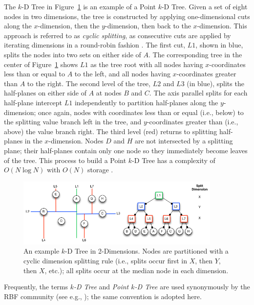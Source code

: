 \documentclass{report}
\begin{document}
The $k$-D Tree in Figure~\ref{fig:kdtree_example} is an example of a Point $k$-D Tree. Given a set of eight nodes in two dimensions, the tree is constructed by applying one-dimensional cuts along the $x$-dimension, then the $y$-dimension, then back to the $x$-dimension. This approach is referred to as \emph{cyclic splitting}, as consecutive cuts are applied by iterating dimensions in a round-robin fashion \cite{Samet2005}. The first cut, $L1$, shown in blue, splits the nodes into two sets on either side of $A$. The corresponding tree in the center of Figure~\ref{fig:kdtree_example} shows $L1$ as the tree root with all nodes having $x$-coordinates less than or equal to $A$ to the left, and all nodes having $x$-coordinates greater than $A$ to the right. The second level of the tree, $L2$ and $L3$ (in blue), splits the half-planes on either side of $A$ at nodes $B$ and $C$. The axis parallel splits for each half-plane intercept $L1$ independently to partition half-planes along the $y$-dimension; once again, nodes with coordinates less than or equal (i.e., below) to the splitting value branch left in the tree, and $y$-coordinates greater than  (i.e., above) the value branch right. The third level (red) returns to splitting half-planes in the $x$-dimension. Nodes $D$ and $H$ are not intersected by a splitting plane; their half-planes contain only one node so they immediately become leaves of the tree. This process to build a Point $k$-D Tree has a complexity of $O(N \log N)$ with $O(N)$ storage \cite{Berg2008,Samet2005}.

\begin{figure}
\centering
\includegraphics[width=0.9\textwidth]{rbffd_methods_content/neighbors/kdTree_example.png}
\caption{An example $k$-D Tree in 2-Dimensions. Nodes are partitioned with a cyclic dimension splitting rule (i.e., splits occur first in $X$, then $Y$, then $X$, etc.); all splits occur at the median node in each dimension. }
\label{fig:kdtree_example}
\end{figure}

Frequently, the terms \emph{$k$-D Tree} and \emph{Point $k$-D Tree} are used synonymously by the RBF community (see e.g., \cite{Fasshauer2007,FlyerLehto11,FornbergLehto11}); the same convention is adopted here. 
\end{document}

